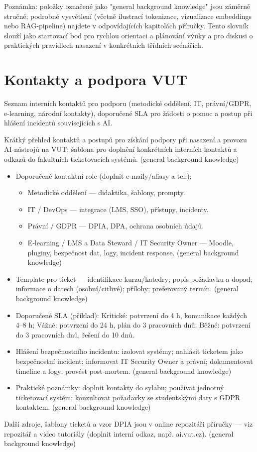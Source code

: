\documentclass{report}%
\begin{document}
Poznámka: položky označené jako "general background knowledge" jsou záměrně stručné; podrobné vysvětlení (včetně ilustrací tokenizace, vizualizace embeddings nebo RAG‑pipeline) najdete v odpovídajících kapitolách příručky. Tento slovník slouží jako startovací bod pro rychlou orientaci a plánování výuky a pro diskusi o praktických pravidlech nasazení v konkrétních třídních scénářích.%

%
\section{Kontakty a podpora VUT}%
Seznam interních kontaktů pro podporu (metodické oddělení, IT, právní/GDPR, e-learning, národní kontakty), doporučené SLA pro žádosti o pomoc a postup při hlášení incidentů souvisejících s AI.%


%
Krátký přehled kontaktů a postupů pro získání podpory při nasazení a provozu AI‑nástrojů na VUT; šablona pro doplnění konkrétních interních kontaktů a odkazů do fakultních ticketovacích systémů. (general background knowledge)
\begin{itemize}
\item Doporučené kontaktní role (doplnit e‑maily/aliasy a tel.): \begin{itemize}
  \item Metodické oddělení — didaktika, šablony, prompty.
  \item IT / DevOps — integrace (LMS, SSO), přístupy, incidenty.
  \item Právní / GDPR — DPIA, DPA, ochrana osobních údajů.
  \item E‑learning / LMS a Data Steward / IT Security Owner — Moodle, pluginy, bezpečnost dat, logy, incident response. (general background knowledge)
\end{itemize}
\item Template pro ticket — identifikace kurzu/katedry; popis požadavku a dopad; informace o datech (osobní/citlivé); přílohy; preferovaný termín. (general background knowledge)
\item Doporučené SLA (příklad): Kritické: potvrzení do 4 h, komunikace každých 4–8 h; Vážné: potvrzení do 24 h, plán do 3 pracovních dnů; Běžné: potvrzení do 3 pracovních dnů, řešení do 10 dnů.
\item Hlášení bezpečnostního incidentu: izolovat systémy; nahlásit ticketem jako bezpečnostní incident; informovat IT Security Owner a právní; dokumentovat timeline a logy; provést post‑mortem. (general background knowledge)
\item Praktické poznámky: doplnit kontakty do sylabu; používat jednotný ticketovací systém; konzultovat požadavky se studentskými daty s GDPR kontaktem. (general background knowledge)
\end{itemize}
Další zdroje, šablony ticketů a vzor DPIA jsou v online repozitáři příručky — viz repozitář a video tutoriály (doplnit interní odkaz, např. ai.vut.cz). (general background knowledge)%
\end{document}
